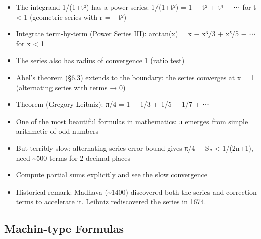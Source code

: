 \documentclass[
  10pt,
  letterpaper,
]{scrbook}
\providecommand{\tightlist}{%
  \setlength{\itemsep}{0pt}\setlength{\parskip}{0pt}}
\begin{document}
\begin{itemize}
\tightlist
\item
  The integrand 1/(1+t²) has a power series: 1/(1+t²) = 1 − t² + t⁴ − ⋯
  for \textbar t\textbar{} \textless{} 1 (geometric series with r = −t²)
\item
  Integrate term-by-term (Power Series III): arctan(x) = x − x³/3 + x⁵/5
  − ⋯ for \textbar x\textbar{} \textless{} 1
\item
  The series also has radius of convergence 1 (ratio test)
\item
  Abel's theorem (§6.3) extends to the boundary: the series converges at
  x = 1 (alternating series with terms → 0)
\item
  Theorem (Gregory-Leibniz): π/4 = 1 − 1/3 + 1/5 − 1/7 + ⋯
\item
  One of the most beautiful formulas in mathematics: π emerges from
  simple arithmetic of odd numbers
\item
  But terribly slow: alternating series error bound gives \textbar π/4 −
  Sₙ\textbar{} \textless{} 1/(2n+1), need \textasciitilde500 terms for 2
  decimal places
\item
  Compute partial sums explicitly and see the slow convergence
\item
  Historical remark: Madhava (\textasciitilde1400) discovered both the
  series and correction terms to accelerate it. Leibniz rediscovered the
  series in 1674.
\end{itemize}

\subsection{Machin-type Formulas}\label{machin-type-formulas}
\end{document}
